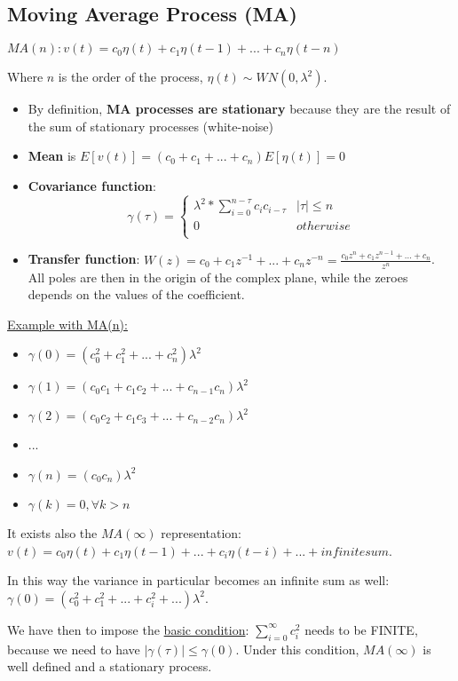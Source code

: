 \documentclass[10pt,a4paper]{article}
\begin{document}
\subsection{Moving Average Process (MA)}
\center 
$MA(n) : v(t) = c_0 \eta(t) + c_1 \eta(t-1) + ... + c_n \eta(t-n)$
\\
\vspace{1em}
\raggedright
Where $n$ is the order of the process, $\eta(t) \sim WN(0,\lambda^2)$. \\
\begin{itemize}
	\item By definition, \textbf{MA processes are stationary} because they are the result of the sum of stationary processes (white-noise)
	\item \textbf{Mean} is $E[v(t)]=(c_0 + c_1 + ... + c_n)E[\eta(t)]=0$
	\item \textbf{Covariance function}:
	\begin{equation}
  		\gamma(\tau) =
    		\begin{cases}
      			\lambda^2 * \sum_{i=0}^{n - \tau} c_ic_{i-\tau} & |\tau| \leq n\\
      			0 & otherwise\\
    \end{cases}  
    \end{equation} 

	\item \textbf{Transfer function}: $W(z)=c_0+c_1z^{-1}+...+c_nz^{-n}=\frac{c_0z^n+c_1z^{n-1}+...+c_n}{z^n}$. \\
	All poles are then in the origin of the complex plane, while the zeroes depends on the values of the coefficient. 
\end{itemize}
\pagebreak
\uline{Example with MA(n):}
\begin{itemize}
	\item $\gamma(0)=(c_0^2+c_1^2+...+c_n^2)\lambda^2$
	\item $\gamma(1)=(c_0c_1+c_1c_2+...+c_{n-1}c_n)\lambda^2$
	\item $\gamma(2)=(c_0c_2+c_1c_3+...+c_{n-2}c_n)\lambda^2$
	\item ...
	\item $\gamma(n)=(c_0c_n)\lambda^2$
	\item $\gamma(k)=0, \forall k > n$
\end{itemize}
It exists also the $MA(\infty)$ representation:
\center $v(t) = c_0\eta(t)+c_1\eta(t-1)+...+c_i\eta(t-i)+... + infinite sum$. 
\\ \raggedright \vspace{0.5em}
In this way the variance in particular becomes an infinite sum as well:
\center $\gamma(0) = (c_0^2+c_1^2+... +c_i^2 + ...) \lambda^2$. 
\\ \raggedright \vspace{0.5em}
We have then to impose the \uline{basic condition}: $\sum_{i=0}^{\infty} c_i^2$ needs to be FINITE, because we need to have $|\gamma(\tau)| \leq \gamma(0)$. Under this condition, $MA(\infty)$ is well defined and a stationary process.
\end{document}

